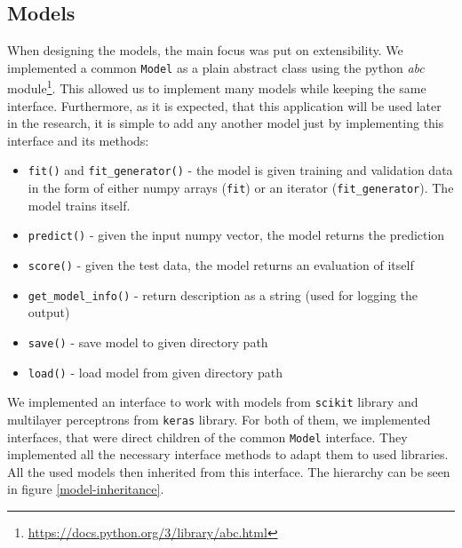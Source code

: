 \subsection*{Models}

When designing the models, the main focus was put on extensibility. We implemented a common \texttt{Model} as a plain abstract class using the python \textit{abc} module\footnote{\url{https://docs.python.org/3/library/abc.html}}. This allowed us to implement many models while keeping the same interface. Furthermore, as it is expected, that this application will be used later in the research, it is simple to add any another model just by implementing this interface and its methods:

\begin{itemize}

\item \texttt{fit()} and \texttt{fit\_generator()} - the model is given training and validation data in the form of either numpy arrays (\texttt{fit}) or an iterator (\texttt{fit\_generator}). The model trains itself.

\item \texttt{predict()} - given the input numpy vector, the model returns the prediction

\item \texttt{score()} - given the test data, the model returns an evaluation of itself

\item \texttt{get\_model\_info()} - return description as a string (used for logging the output)

\item \texttt{save()} - save model to given directory path

\item \texttt{load()} - load model from given directory path

\end{itemize} 

We implemented an interface to work with models from \texttt{scikit} library and multilayer perceptrons from \texttt{keras} library. For both of them, we implemented interfaces, that were direct children of the common \texttt{Model} interface. They implemented all the necessary interface methods to adapt them to used libraries. All the used models then inherited from this interface. The hierarchy can be seen in figure \ref{model-inheritance}.

